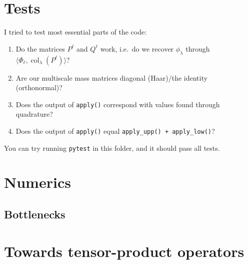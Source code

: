 \documentclass[11pt,a4paper]{amsart}
\theoremstyle{definition}
\DeclareMathOperator{\col}{col}
\begin{document}
\section{Tests}
I tried to test most essential parts of the code:
\begin{enumerate}
  \item Do the matrices $P^\ell$ and $Q^\ell$ work, i.e.~do we recover $\phi_\lambda$
    through $\langle \Phi_\ell, \col_\lambda(P^\ell) \rangle$?
  \item Are our multiscale mass matrices diagonal (Haar)/the identity (orthonormal)?
  \item Does the output of \texttt{apply()} correspond with values found through quadrature?
  \item Does the output of \texttt{apply()} equal \texttt{apply\_upp() + apply\_low()}?
\end{enumerate}
You can try running \texttt{pytest} in this folder, and it should pass all tests.

\section{Numerics}
\subsection{Bottlenecks}

\section{Towards tensor-product operators}
\end{document}
